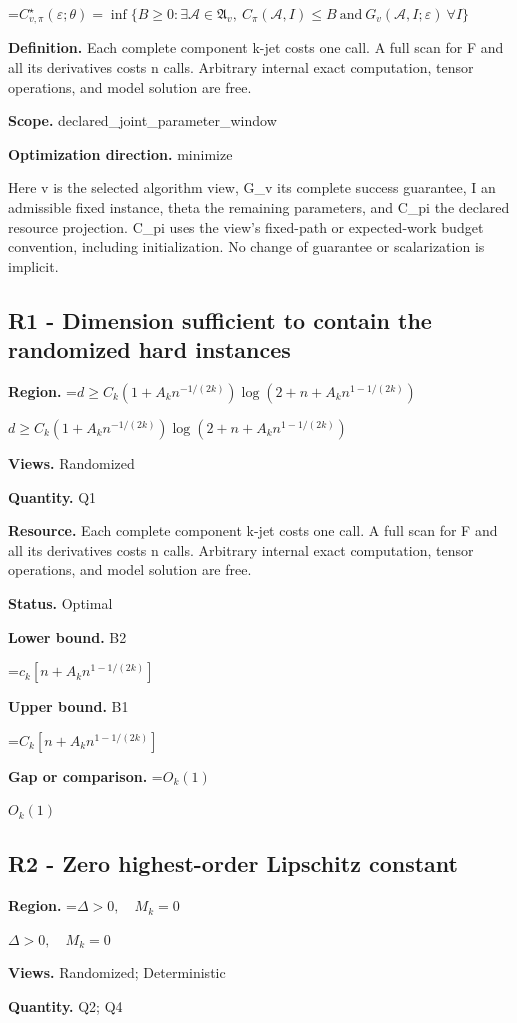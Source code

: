 \documentclass[10pt,a4paper]{article}
\newcommand{\AtlasMath}[1]{\par\begingroup\centering\setbox0=\hbox{$\displaystyle #1$}\ifdim\wd0>1.4\linewidth\typeout{ATLAS WIDE FORMULA: \the\wd0}\fi\ifdim\wd0>\linewidth\resizebox{\linewidth}{!}{\box0}\else\box0\fi\par\endgroup}
\newcommand{\AtlasInlineMath}[1]{\begingroup\setbox0=\hbox{$#1$}\ifdim\wd0>.4\linewidth\endgroup\AtlasMath{#1}\else\endgroup$#1$\fi}
\begin{document}
\AtlasMath{C^\star_{v,\pi}(\varepsilon;\theta)=\inf\{B\ge0:\exists\mathcal A\in\mathfrak A_v,\ C_\pi(\mathcal A,I)\le B\ \text{and}\ G_v(\mathcal A,I;\varepsilon)\ \forall I\}}
\textbf{Definition.} Each complete component k-jet costs one call. A full scan for F and all its derivatives costs n calls. Arbitrary internal exact computation, tensor operations, and model solution are free.

\textbf{Scope.} declared\_joint\_parameter\_window

\textbf{Optimization direction.} minimize

Here v is the selected algorithm view, G\_v its complete success guarantee, I an admissible fixed instance, theta the remaining parameters, and C\_pi the declared resource projection. C\_pi uses the view's fixed-path or expected-work budget convention, including initialization. No change of guarantee or scalarization is implicit.

\subsection{R1 - Dimension sufficient to contain the randomized hard instances}
\textbf{Region.} \AtlasInlineMath{d\ge C_k(1+A_kn^{-1/(2k)})\log(2+n+A_kn^{1-1/(2k)})}

\textbf{Views.} Randomized

\textbf{Quantity.} Q1

\textbf{Resource.} Each complete component k-jet costs one call. A full scan for F and all its derivatives costs n calls. Arbitrary internal exact computation, tensor operations, and model solution are free.

\textbf{Status.} Optimal

\textbf{Lower bound.} B2

\AtlasMath{c_k[n+A_kn^{1-1/(2k)}]}
\textbf{Upper bound.} B1

\AtlasMath{C_k[n+A_kn^{1-1/(2k)}]}
\textbf{Gap or comparison.} \AtlasInlineMath{O_k(1)}

\subsection{R2 - Zero highest-order Lipschitz constant}
\textbf{Region.} \AtlasInlineMath{\Delta>0,\quad M_k=0}

\textbf{Views.} Randomized; Deterministic

\textbf{Quantity.} Q2; Q4
\end{document}
